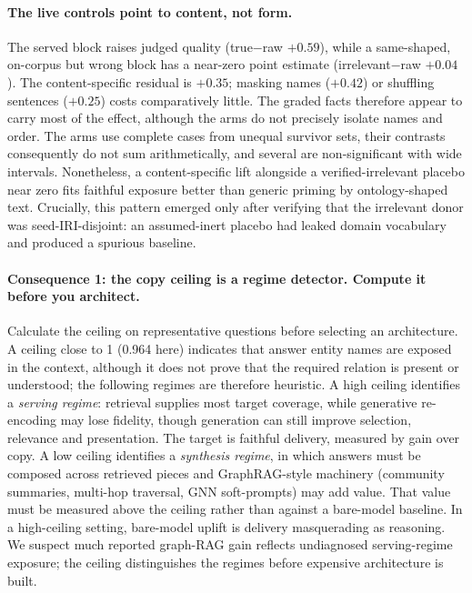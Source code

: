 \documentclass[10pt,twocolumn]{article}
\begin{document}
\paragraph{The live controls point to content, not form.} The served block raises judged quality (true$-$raw $+0.59$), while a same-shaped, on-corpus but wrong block has a near-zero point estimate (irrelevant$-$raw $+0.04$). The content-specific residual is $+0.35$; masking names ($+0.42$) or shuffling sentences ($+0.25$) costs comparatively little. The graded facts therefore appear to carry most of the effect, although the arms do not precisely isolate names and order. The arms use complete cases from unequal survivor sets, their contrasts consequently do not sum arithmetically, and several are non-significant with wide intervals. Nonetheless, a content-specific lift alongside a verified-irrelevant placebo near zero fits faithful exposure better than generic priming by ontology-shaped text. Crucially, this pattern emerged only after verifying that the irrelevant donor was seed-IRI-disjoint: an assumed-inert placebo had leaked domain vocabulary and produced a spurious baseline.

\paragraph{Consequence 1: the copy ceiling is a regime detector. Compute it before you architect.}
Calculate the ceiling on representative questions before selecting an architecture. A ceiling close to 1 (0.964 here) indicates that answer entity names are exposed in the context, although it does not prove that the required relation is present or understood; the following regimes are therefore heuristic. A high ceiling identifies a \emph{serving regime}: retrieval supplies most target coverage, while generative re-encoding may lose fidelity, though generation can still improve selection, relevance and presentation. The target is faithful delivery, measured by gain over copy. A low ceiling identifies a \emph{synthesis regime}, in which answers must be composed across retrieved pieces and GraphRAG-style machinery (community summaries, multi-hop traversal, GNN soft-prompts) may add value. That value must be measured above the ceiling rather than against a bare-model baseline. In a high-ceiling setting, bare-model uplift is delivery masquerading as reasoning. We suspect much reported graph-RAG gain reflects undiagnosed serving-regime exposure; the ceiling distinguishes the regimes before expensive architecture is built.
\end{document}
